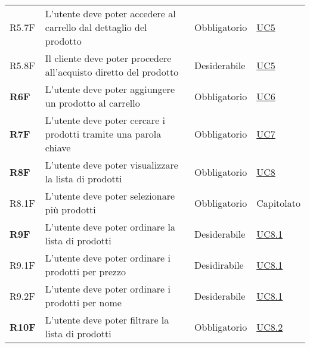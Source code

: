 \begin{center}
\begin{longtable}[!h]{p{50px} p{245px} p{75px} p{50px}}
        R5.7F                                 & L'utente deve poter accedere al carrello dal dettaglio del prodotto                                        & Obbligatorio             & \hyperref[sec:UC5]{UC5}                      \\
        R5.8F                                 & Il cliente deve poter procedere all'acquisto diretto del prodotto                                          & Desiderabile             & \hyperref[sec:UC5]{UC5}                      \\
        \textbf{R6F}                          & L'utente deve poter aggiungere un prodotto al carrello                                                     & Obbligatorio             & \hyperref[sec:UC6]{UC6}                      \\
        \textbf{R7F}                          & L'utente deve poter cercare i prodotti tramite una parola chiave                                           & Obbligatorio             & \hyperref[sec:UC7]{UC7}                      \\
        \textbf{R8F}                          & L'utente deve poter visualizzare la lista di prodotti                                                      & Obbligatorio             & \hyperref[sec:UC8]{UC8}                      \\
        R8.1F                                 & L'utente deve poter selezionare più prodotti                                                               & Obbligatorio             & Capitolato                                   \\
        \textbf{R9F}                          & L'utente deve poter ordinare la lista di prodotti                                                          & Desiderabile             & \hyperref[sec:UC8.1]{UC8.1}                  \\
        R9.1F                                 & L'utente deve poter ordinare i prodotti per prezzo                                                         & Desidirabile             & \hyperref[sec:UC8.1]{UC8.1}                  \\
        R9.2F                                 & L'utente deve poter ordinare i prodotti per nome                                                           & Desiderabile             & \hyperref[sec:UC8.1]{UC8.1}                  \\
        \textbf{R10F}                         & L'utente deve poter filtrare la lista di prodotti                                                          & Obbligatorio             & \hyperref[sec:UC8.2]{UC8.2}                  \\

\end{longtable}
\end{center}
